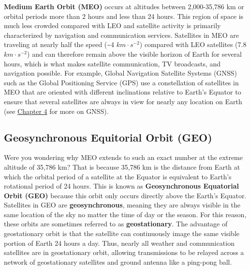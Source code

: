 \documentclass[
]{book}
\begin{document}
\textbf{Medium Earth Orbit (MEO)} occurs at altitudes between 2,000-35,786 km or orbital periods more than 2 hours and less than 24 hours. This region of space is much less crowded compared with LEO and satellite activity is primarily characterized by navigation and communication services. Satellites in MEO are traveling at nearly half the speed (\textasciitilde4 \(km·s^{-2}\)) compared with LEO satellites (7.8 \(km·s^{-2}\)) and can therefore remain above the visible horizon of Earth for several hours, which is what makes satellite communication, TV broadcasts, and navigation possible. For example, Global Navigation Satellite Systems (GNSS) such as the Global Positioning Service (GPS) use a constellation of satellites in MEO that are oriented with different inclinations relative to Earth's Equator to ensure that several satellites are always in view for nearly any location on Earth (see \href{https://ubc-geomatics-textbook.github.io/geomatics-textbook/collecting-and-editing-data.html}{Chapter 4} for more on GNSS).

\hypertarget{geosynchronous-equitorial-orbit-geo}{%
\subsection{Geosynchronous Equitorial Orbit (GEO)}\label{geosynchronous-equitorial-orbit-geo}}

Were you wondering why MEO extends to such an exact number at the extreme altitude of 35,786 km? That is because 35,786 km is the distance from Earth at which the orbital period of a satellite at the Equator is equivalent to Earth's rotational period of 24 hours. This is known as \textbf{Geosynchronous Equatorial Orbit (GEO)} because this orbit only occurs directly above the Earth's Equator. Satellites in GEO are \textbf{geosynchronous}, meaning they are always visible in the same location of the sky no matter the time of day or the season. For this reason, these orbits are sometimes referred to as \textbf{geostationary}. The advantage of geostationary orbit is that the satellite can continuously image the same visible portion of Earth 24 hours a day. Thus, nearly all weather and communication satellites are in geostationary orbit, allowing transmissions to be relayed across a network of geostationary satellites and ground antenna like a ping-pong ball.
\end{document}
